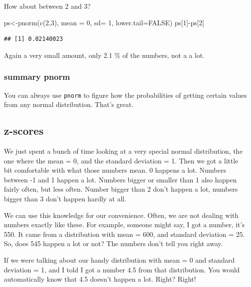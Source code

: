 \documentclass[
]{book}
\newenvironment{Shaded}{\begin{snugshade}}{\end{snugshade}}
\newcommand{\AttributeTok}[1]{\textcolor[rgb]{0.77,0.63,0.00}{#1}}
\newcommand{\ConstantTok}[1]{\textcolor[rgb]{0.00,0.00,0.00}{#1}}
\newcommand{\DecValTok}[1]{\textcolor[rgb]{0.00,0.00,0.81}{#1}}
\newcommand{\FunctionTok}[1]{\textcolor[rgb]{0.00,0.00,0.00}{#1}}
\newcommand{\NormalTok}[1]{#1}
\newcommand{\OtherTok}[1]{\textcolor[rgb]{0.56,0.35,0.01}{#1}}
\newcommand{\SpecialCharTok}[1]{\textcolor[rgb]{0.00,0.00,0.00}{#1}}
\begin{document}
How about between 2 and 3?

\begin{Shaded}
\begin{Highlighting}[]
\NormalTok{ps}\OtherTok{\textless{}{-}}\FunctionTok{pnorm}\NormalTok{(}\FunctionTok{c}\NormalTok{(}\DecValTok{2}\NormalTok{,}\DecValTok{3}\NormalTok{), }\AttributeTok{mean =} \DecValTok{0}\NormalTok{, }\AttributeTok{sd=} \DecValTok{1}\NormalTok{, }\AttributeTok{lower.tail=}\ConstantTok{FALSE}\NormalTok{)}
\NormalTok{ps[}\DecValTok{1}\NormalTok{]}\SpecialCharTok{{-}}\NormalTok{ps[}\DecValTok{2}\NormalTok{]}
\end{Highlighting}
\end{Shaded}

\begin{verbatim}
## [1] 0.02140023
\end{verbatim}

Again a very small amount, only 2.1 \% of the numbers, not a a lot.

\hypertarget{summary-pnorm}{%
\subsubsection{summary pnorm}\label{summary-pnorm}}

You can always use \texttt{pnorm} to figure how the probabilities of getting certain values from any normal distribution. That's great.

\hypertarget{z-scores}{%
\subsection{z-scores}\label{z-scores}}

We just spent a bunch of time looking at a very special normal distribution, the one where the mean = 0, and the standard deviation = 1. Then we got a little bit comfortable with what those numbers mean. 0 happens a lot. Numbers between -1 and 1 happen a lot. Numbers bigger or smaller than 1 also happen fairly often, but less often. Number bigger than 2 don't happen a lot, numbers bigger than 3 don't happen hardly at all.

We can use this knowledge for our convenience. Often, we are not dealing with numbers exactly like these. For example, someone might say, I got a number, it's 550. It came from a distribution with mean = 600, and standard deviation = 25. So, does 545 happen a lot or not? The numbers don't tell you right away.

If we were talking about our handy distribution with mean = 0 and standard deviation = 1, and I told I got a number 4.5 from that distribution. You would automatically know that 4.5 doesn't happen a lot. Right? Right!
\end{document}
